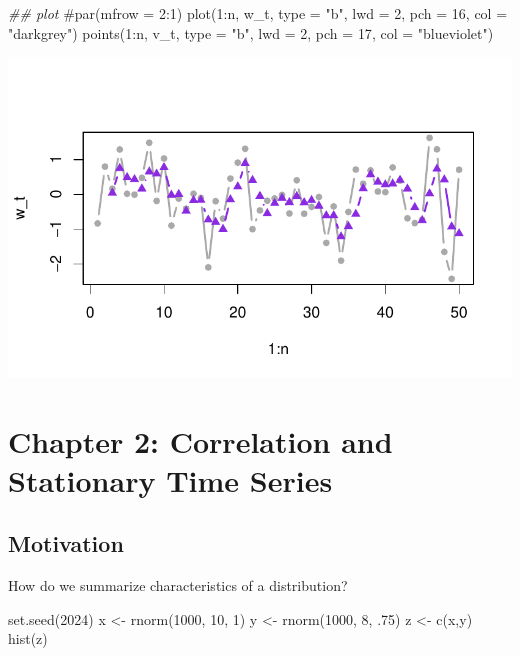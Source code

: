 \documentclass[
  letterpaper,
  DIV=11,
  numbers=noendperiod]{scrreprt}
\newenvironment{Shaded}{\begin{snugshade}}{\end{snugshade}}
\newcommand{\AttributeTok}[1]{\textcolor[rgb]{0.40,0.45,0.13}{#1}}
\newcommand{\CommentTok}[1]{\textcolor[rgb]{0.37,0.37,0.37}{#1}}
\newcommand{\DecValTok}[1]{\textcolor[rgb]{0.68,0.00,0.00}{#1}}
\newcommand{\DocumentationTok}[1]{\textcolor[rgb]{0.37,0.37,0.37}{\textit{#1}}}
\newcommand{\FunctionTok}[1]{\textcolor[rgb]{0.28,0.35,0.67}{#1}}
\newcommand{\NormalTok}[1]{\textcolor[rgb]{0.00,0.23,0.31}{#1}}
\newcommand{\OtherTok}[1]{\textcolor[rgb]{0.00,0.23,0.31}{#1}}
\newcommand{\SpecialCharTok}[1]{\textcolor[rgb]{0.37,0.37,0.37}{#1}}
\newcommand{\StringTok}[1]{\textcolor[rgb]{0.13,0.47,0.30}{#1}}
\begin{document}
\begin{Shaded}
\begin{Highlighting}[]
\DocumentationTok{\#\# plot}
\CommentTok{\#par(mfrow = 2:1)}
\FunctionTok{plot}\NormalTok{(}\DecValTok{1}\SpecialCharTok{:}\NormalTok{n, w\_t, }\AttributeTok{type =} \StringTok{"b"}\NormalTok{, }\AttributeTok{lwd =} \DecValTok{2}\NormalTok{, }\AttributeTok{pch =} \DecValTok{16}\NormalTok{, }\AttributeTok{col =} \StringTok{"darkgrey"}\NormalTok{)}
\FunctionTok{points}\NormalTok{(}\DecValTok{1}\SpecialCharTok{:}\NormalTok{n, v\_t, }\AttributeTok{type =} \StringTok{"b"}\NormalTok{, }\AttributeTok{lwd =} \DecValTok{2}\NormalTok{, }\AttributeTok{pch =} \DecValTok{17}\NormalTok{, }\AttributeTok{col =} \StringTok{"blueviolet"}\NormalTok{)}
\end{Highlighting}
\end{Shaded}

\includegraphics{LectureNotes/Lecture2_files/figure-pdf/unnamed-chunk-7-1.pdf}

\chapter{Chapter 2: Correlation and Stationary Time
Series}\label{chapter-2-correlation-and-stationary-time-series}

\section{Motivation}\label{motivation}

How do we summarize characteristics of a distribution?

\begin{Shaded}
\begin{Highlighting}[]
\FunctionTok{set.seed}\NormalTok{(}\DecValTok{2024}\NormalTok{)}
\NormalTok{x }\OtherTok{\textless{}{-}} \FunctionTok{rnorm}\NormalTok{(}\DecValTok{1000}\NormalTok{, }\DecValTok{10}\NormalTok{, }\DecValTok{1}\NormalTok{)}
\NormalTok{y }\OtherTok{\textless{}{-}} \FunctionTok{rnorm}\NormalTok{(}\DecValTok{1000}\NormalTok{, }\DecValTok{8}\NormalTok{, .}\DecValTok{75}\NormalTok{)}
\NormalTok{z }\OtherTok{\textless{}{-}} \FunctionTok{c}\NormalTok{(x,y)}
\FunctionTok{hist}\NormalTok{(z)}
\end{Highlighting}
\end{Shaded}
\end{document}
